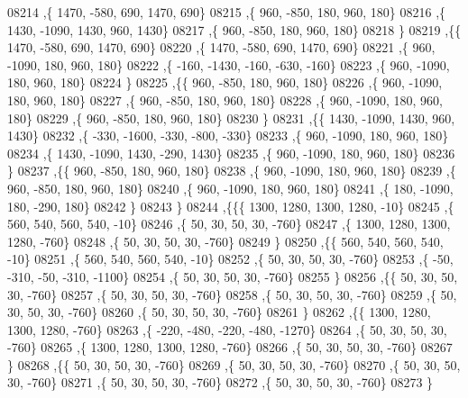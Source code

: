 \begin{DoxyCode}
08214     ,\{  1470,  -580,   690,  1470,   690\}
08215     ,\{   960,  -850,   180,   960,   180\}
08216     ,\{  1430, -1090,  1430,   960,  1430\}
08217     ,\{   960,  -850,   180,   960,   180\}
08218     \}
08219    ,\{\{  1470,  -580,   690,  1470,   690\}
08220     ,\{  1470,  -580,   690,  1470,   690\}
08221     ,\{   960, -1090,   180,   960,   180\}
08222     ,\{  -160, -1430,  -160,  -630,  -160\}
08223     ,\{   960, -1090,   180,   960,   180\}
08224     \}
08225    ,\{\{   960,  -850,   180,   960,   180\}
08226     ,\{   960, -1090,   180,   960,   180\}
08227     ,\{   960,  -850,   180,   960,   180\}
08228     ,\{   960, -1090,   180,   960,   180\}
08229     ,\{   960,  -850,   180,   960,   180\}
08230     \}
08231    ,\{\{  1430, -1090,  1430,   960,  1430\}
08232     ,\{  -330, -1600,  -330,  -800,  -330\}
08233     ,\{   960, -1090,   180,   960,   180\}
08234     ,\{  1430, -1090,  1430,  -290,  1430\}
08235     ,\{   960, -1090,   180,   960,   180\}
08236     \}
08237    ,\{\{   960,  -850,   180,   960,   180\}
08238     ,\{   960, -1090,   180,   960,   180\}
08239     ,\{   960,  -850,   180,   960,   180\}
08240     ,\{   960, -1090,   180,   960,   180\}
08241     ,\{   180, -1090,   180,  -290,   180\}
08242     \}
08243    \}
08244   ,\{\{\{  1300,  1280,  1300,  1280,   -10\}
08245     ,\{   560,   540,   560,   540,   -10\}
08246     ,\{    50,    30,    50,    30,  -760\}
08247     ,\{  1300,  1280,  1300,  1280,  -760\}
08248     ,\{    50,    30,    50,    30,  -760\}
08249     \}
08250    ,\{\{   560,   540,   560,   540,   -10\}
08251     ,\{   560,   540,   560,   540,   -10\}
08252     ,\{    50,    30,    50,    30,  -760\}
08253     ,\{   -50,  -310,   -50,  -310, -1100\}
08254     ,\{    50,    30,    50,    30,  -760\}
08255     \}
08256    ,\{\{    50,    30,    50,    30,  -760\}
08257     ,\{    50,    30,    50,    30,  -760\}
08258     ,\{    50,    30,    50,    30,  -760\}
08259     ,\{    50,    30,    50,    30,  -760\}
08260     ,\{    50,    30,    50,    30,  -760\}
08261     \}
08262    ,\{\{  1300,  1280,  1300,  1280,  -760\}
08263     ,\{  -220,  -480,  -220,  -480, -1270\}
08264     ,\{    50,    30,    50,    30,  -760\}
08265     ,\{  1300,  1280,  1300,  1280,  -760\}
08266     ,\{    50,    30,    50,    30,  -760\}
08267     \}
08268    ,\{\{    50,    30,    50,    30,  -760\}
08269     ,\{    50,    30,    50,    30,  -760\}
08270     ,\{    50,    30,    50,    30,  -760\}
08271     ,\{    50,    30,    50,    30,  -760\}
08272     ,\{    50,    30,    50,    30,  -760\}
08273     \}

\end{DoxyCode}
